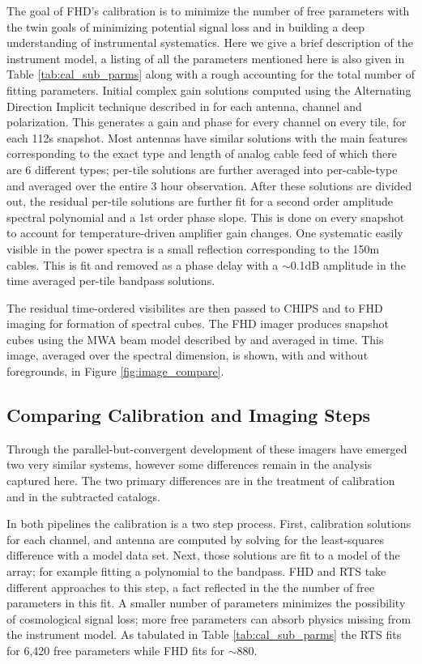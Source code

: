 \documentclass[twolcolumn,iop]{emulateapj}
\begin{document}
The goal of FHD's calibration is to minimize the number of free parameters with the twin goals of minimizing potential signal loss and in building a deep understanding of instrumental systematics. Here we give a brief description of the instrument model, a listing of all the parameters mentioned here is also given in Table \ref{tab:cal_sub_parms} along with a rough accounting for the total number of fitting parameters. Initial complex gain solutions computed using the Alternating Direction Implicit technique described in \citet{sal14} for each antenna, channel and polarization.  This generates a gain and phase for every channel on every tile, for each 112s snapshot.  Most antennas have similar solutions with the main features corresponding to the exact type and length of analog cable feed of which there are 6 different types; per-tile solutions are further averaged into per-cable-type and averaged over the entire 3 hour observation. After these solutions are divided out, the residual per-tile solutions are further fit for a second order amplitude spectral polynomial and a 1st order phase slope. This is done on every snapshot to account for temperature-driven amplifier gain changes. 
One systematic easily visible in the power spectra is a small reflection corresponding to the 150m cables. This is fit and removed as a phase delay with a $\sim$0.1dB amplitude in the time averaged per-tile bandpass solutions.


The residual time-ordered visibilites are then passed to CHIPS and to FHD imaging for formation of spectral cubes.  The FHD imager  produces snapshot cubes using the MWA beam model described by \cite{Sutinjo:2015RaSc...50...52S} and averaged in time. This image, averaged over the spectral dimension, is shown, with and without foregrounds, in Figure \ref{fig:image_compare}.

\subsection{Comparing Calibration and Imaging Steps}
\label{sec:comparing_imaging}
Through the parallel-but-convergent development of these imagers have emerged two very similar systems, however some differences remain in the analysis captured here. The two primary differences are in the treatment of calibration and in the subtracted catalogs.  

In both pipelines the calibration is a two step process. First, calibration solutions for each channel, and antenna are computed by solving for the least-squares difference with a model data set. Next, those solutions are fit to a model of the array; for example fitting a polynomial to the bandpass. FHD and RTS take different approaches to this step, a fact reflected in the the number of free parameters in this fit. A smaller number of parameters minimizes the possibility of cosmological signal loss; more free parameters can absorb physics missing from the instrument model.  As tabulated in Table \ref{tab:cal_sub_parms} the RTS fits for 6,420 free parameters while FHD fits for $\sim$880.  
\end{document}
